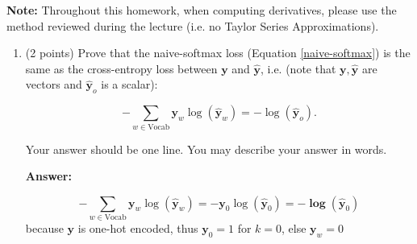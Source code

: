 \documentclass{article}
\newenvironment{answer}{
    {\bf Answer:} \sf \begingroup\color{red}
}{\endgroup}%
\begin{document}
\textbf{Note:} Throughout this homework, when computing derivatives, please use the method reviewed during the lecture (i.e. no Taylor Series Approximations).

\clearpage 
\begin{enumerate}[label=(\alph*)]
\item (2 points) 
Prove that the naive-softmax loss (Equation \ref{naive-softmax}) is the same as the cross-entropy loss between $\bm y$ and $\hat{\bm y}$, i.e. (note that $\bm y, \hat{\bm y}$ are vectors and $\hat{\bm y}_o$ is a scalar):

\begin{equation} 
-\sum_{w \in \text{Vocab}} \bm y_w \log(\hat{\bm y}_w) = - \log (\hat{\bm y}_o).
\end{equation}

Your answer should be one line. You may describe your answer in words.
\begin{shaded}
\begin{answer}

$$-\sum_{w \in \text{Vocab}} \bm y_w \log(\hat{\bm y}_w) = - \bm y_0 \log(\hat{\bm y}_0) = - \bm \log(\hat{\bm y}_0)$$
because $\bm y$ is one-hot encoded, thus $\bm y_0 = 1$ for $k=0$, else $\bm y_w = 0$

\end{answer}
\end{shaded}


\end{enumerate}
\end{document}
